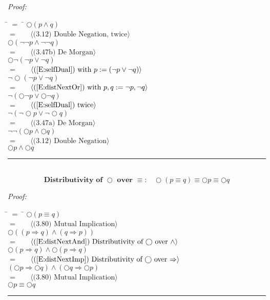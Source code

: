 \documentclass[fleqn, leqno]{article}
\newcommand{\lgap}{2pt}                             %
\newcommand{\mymathindent}{24pt}                    %
\newcommand{\Next}{\bigcirc}
\newcommand{\myqed}{\hfill\rule[-.23ex]{1.2ex}{2.0ex}}
\newcommand{\Gll} {\langle}                         %
\newcommand{\Ggg} {\rangle}                         %
\newcommand{\Hint}[1]     {\ \ \ $\Gll              \mbox{#1} \Ggg$ }   %
\begin{document}
\emph{Proof:}
\begin{tabbing}
\hspace{\mymathindent} \= $= \;$ \= \kill
  \> \>   $\Next (p \land q)$\\[\lgap]
  \> $=$  \>  \Hint{(3.12) Double Negation, twice}\\[\lgap]
  \> \>   $\Next (\lnot\lnot p \land \lnot\lnot q)$\\[\lgap]
  \> $=$  \>  \Hint{(3.47b) De Morgan}\\[\lgap]
  \> \>   $\Next\lnot(\lnot p \lor \lnot q)$\\[\lgap]
  \> $=$  \>  \Hint{(\ref{E:selfDual}) with $p:= (\lnot p \lor \lnot q$)}\\[\lgap]
  \> \>   $\lnot\Next (\lnot p \lor \lnot q)$\\[\lgap]
  \> $=$  \>  \Hint{(\ref{E:distNextOr}) with $p,q := \lnot p, \lnot q$}\\[\lgap]
  \> \>   $\lnot (\Next\lnot p \lor \Next \lnot q)$\\[\lgap]
  \> $=$  \>  \Hint{(\ref{E:selfDual}) twice}\\[\lgap]
  \> \>   $\lnot(\lnot\Next p \lor \lnot\Next q)$\\[\lgap]
  \> $=$  \>  \Hint{(3.47a) De Morgan}\\[\lgap]
  \> \>   $\lnot\lnot(\Next p \land \Next q)$\\[\lgap]
  \> $=$  \>  \Hint{(3.12) Double Negation}\\[\lgap]
  \> \>   $\Next p \land \Next q$\\[\lgap]
\end{tabbing}
\myqed\\[\lgap]


\begin{equation}\label{E:distNextEquiv}
\textbf{Distributivity of $\Next$ over $\equiv$:}\quad \Next (p \equiv q) \equiv \Next p \equiv \Next q
\end{equation}

\emph{Proof:}
\begin{tabbing}
\hspace{\mymathindent} \= $= \;$ \= \kill
  \> \>   $\Next (p \equiv q)$\\[\lgap]
  \> $=$  \>  \Hint{(3.80) Mutual Implication}\\[\lgap]
  \> \>   $\Next ((p \Rightarrow q) \land (q \Rightarrow p))$\\[\lgap]
  \> $=$  \>  \Hint{(\ref{E:distNextAnd}) Distributivity of $\Next$ over $\land$}\\[\lgap]
  \> \>   $\Next (p \Rightarrow q) \land \Next (p \Rightarrow q)$\\[\lgap]
  \> $=$  \>  \Hint{(\ref{E:distNextImp}) Distributivity of $\Next$ over $\Rightarrow$}\\[\lgap]
  \> \>   $(\Next p \Rightarrow \Next q) \land (\Next q \Rightarrow \Next p)$\\[\lgap]
  \> $=$  \>  \Hint{(3.80) Mutual Implication}\\[\lgap]
  \> \>   $\Next p \equiv \Next q$
\end{tabbing}
\myqed\\[\lgap]
\end{document}
